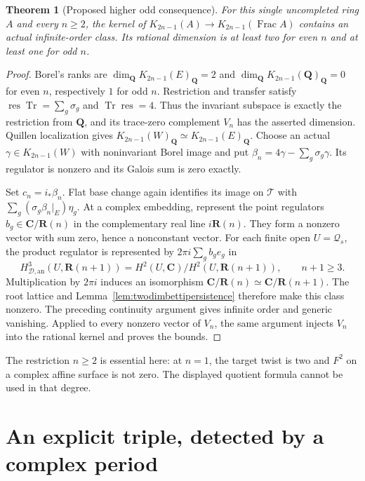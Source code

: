 \documentclass[11pt,a4paper]{article}
\newtheorem{theorem}{Theorem}[section]
\theoremstyle{remark}
\newcommand{\Q}{\mathbf Q}
\newcommand{\R}{\mathbf R}
\newcommand{\C}{\mathbf C}
\newcommand{\Frac}{\operatorname{Frac}}
\newcommand{\HD}{H_{\mathcal D,\mathrm{an}}}
\begin{document}
\begin{theorem}[Proposed higher odd consequence]
\label{thm:twodimalloddgeometric}
For this single uncompleted ring $A$ and every $n\ge2$, the kernel of
$K_{2n-1}(A)\to K_{2n-1}(\Frac A)$ contains an actual infinite-order
class. Its rational dimension is at least two for even $n$ and at
least one for odd $n$.
\end{theorem}
\begin{proof}
Borel's ranks are $\dim_{\Q}K_{2n-1}(E)_{\Q}=2$ and
$\dim_{\Q}K_{2n-1}(\Q)_{\Q}=0$ for even $n$, respectively $1$
for odd $n$. Restriction and transfer satisfy
$\operatorname{res}\operatorname{Tr}=\sum_g\sigma_g$ and
$\operatorname{Tr}\operatorname{res}=4$. Thus the invariant subspace
is exactly the restriction from $\Q$, and its trace-zero complement
$V_n$ has the asserted dimension. Quillen localization gives
$K_{2n-1}(W)_{\Q}\simeq K_{2n-1}(E)_{\Q}$.
Choose an actual $\gamma\in K_{2n-1}(W)$ with noninvariant Borel
image and put $\beta_n=4\gamma-\sum_g\sigma_g\gamma$.
Its regulator is nonzero and its Galois sum is zero exactly.

Set $c_n=i_*\beta_n$. Flat base change again identifies its image
on $\mathcal T$ with $\sum_g(\sigma_g\beta_n|_E)\eta_g$.
At a complex embedding, represent the point regulators
$b_g\in\C/\R(n)$ in the complementary real line $i\R(n)$.
They form a nonzero vector with sum zero, hence a nonconstant vector.
For each finite open $U=\mathcal Q_s$, the product regulator is
represented by $2\pi i\sum_gb_ge_g$ in
\[
 \HD^3(U,\R(n+1))=H^2(U,\C)/H^2(U,\R(n+1)),
 \qquad n+1\ge3.
\]
Multiplication by $2\pi i$ induces an isomorphism
$\C/\R(n)\simeq\C/\R(n+1)$. The root lattice and
Lemma~\ref{lem:twodimbettipersistence} therefore make this class
nonzero. The preceding continuity argument gives infinite order
and generic vanishing. Applied to every nonzero vector of $V_n$,
the same argument injects $V_n$ into the rational kernel and proves
the bounds.
\end{proof}

The restriction $n\ge2$ is essential here: at $n=1$, the target
twist is two and $F^2$ on a complex affine surface is not zero.
The displayed quotient formula cannot be used in that degree.


\section{An explicit triple, detected by a complex period}
\label{sec:twodimexplicitgeometric}
\end{document}
